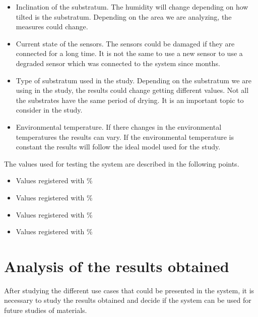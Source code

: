 \begin{itemize}

\item Inclination of the substratum. The humidity will change depending on how tilted is the substratum. Depending on the area we are analyzing, the measures could change.

\item Current state of the sensors. The sensors could be damaged if they are connected for a long time. It is not the same to use a new sensor to use a degraded sensor which was connected to the system since months.

\item Type of substratum used in the study. Depending on the substratum we are using in the study, the results could change getting different values. Not all the substrates have the same period of drying. It is an important topic to consider in the study.

\item Environmental temperature. If there changes in the environmental temperatures the results can vary. If the environmental temperature is constant the results will follow the ideal model used for the study.

\end{itemize}

The values used for testing the system are described in the following points.

\begin{itemize}

\item Values registered with \%

\item Values registered with \%

\item Values registered with \%

\item Values registered with \%

\end{itemize}

\section{Analysis of the results obtained}

After studying the different use cases that could be presented in the system, it is necessary to study the results obtained and decide if the system can be used for future studies of materials.\\

